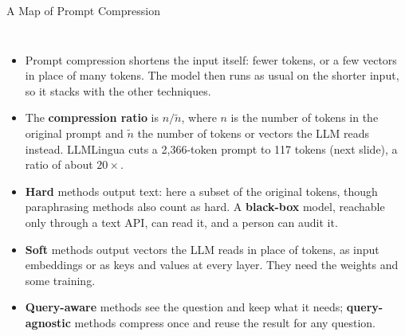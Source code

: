 \begin{frame}{A Map of Prompt Compression}
  \begin{columns}[T,onlytextwidth]
      \begin{itemize}\scriptsize\itemsep0.45em
        \item[\textcolor{red}{$\blacktriangleright$}] Prompt compression shortens the input itself: fewer tokens, or a few vectors in place of many tokens. The model then runs as usual on the shorter input, so it stacks with the other techniques.
        \item[\textcolor{red}{$\blacktriangleright$}] The \textbf{compression ratio} is $n/\tilde n$, where $n$ is the number of tokens in the original prompt and $\tilde n$ the number of tokens or vectors the LLM reads instead. LLMLingua cuts a 2,366-token prompt to 117 tokens (next slide), a ratio of about $20\times$.
        \item[\textcolor{red}{$\blacktriangleright$}] \textbf{Hard} methods output text: here a subset of the original tokens, though paraphrasing methods also count as hard. A \textbf{black-box} model, reachable only through a text API, can read it, and a person can audit it.
        \item[\textcolor{red}{$\blacktriangleright$}] \textbf{Soft} methods output vectors the LLM reads in place of tokens, as input embeddings or as keys and values at every layer. They need the weights and some training.
        \item[\textcolor{red}{$\blacktriangleright$}] \textbf{Query-aware} methods see the question and keep what it needs; \textbf{query-agnostic} methods compress once and reuse the result for any question.
      \end{itemize}
      \centering
      \vspace{0.2em}
\end{columns}
\end{frame}
